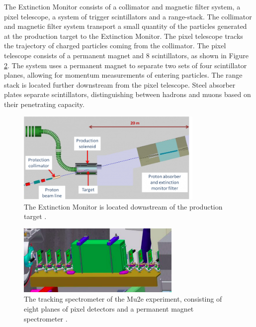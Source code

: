   The Extinction 
Monitor consists of a collimator and magnetic filter 
system, a pixel telescope, a system of trigger scintillators and a range-stack. The collimator and 
magnetic filter system transport a small quantity of 
the particles generated at the production target to the Extinction Monitor. The pixel telescope 
tracks the trajectory of charged particles coming from 
the collimator. The pixel telescope consists of a permanent magnet and 8 scintillators, as shown 
in Figure \ref{fig:extintionmonitor}. The system uses a 
permanent magnet to separate two sets of four scintillator planes, allowing for momentum measurements 
of entering particles. The range stack is located further 
downstream from the pixel telescope. Steel absorber plates separate scintillators, distinguishing 
between hadrons and muons based on their penetrating capacity.
\begin{figure}[!h]
\centering
\includegraphics[width =0.8\textwidth]{figures/png/800px-Extinction_filter.png}
\caption[The Extintion Monitor location.]{The Extinction Monitor is located downstream of the
production target \cite{Prebys:IPAC2015-THPF121}.}
\label{fig:extintion}
\end{figure}
\begin{figure}[!h]
\centering
\includegraphics[width =0.7\textwidth]{figures/png/Screenshot_20240306_184720.png}
\caption[The Extintion Monitor.]{The tracking spectrometer of the Mu2e experiment, consisting of eight planes of pixel detectors and a permanent magnet spectrometer \cite{Prebys:IPAC2015-THPF121}.}
\label{fig:extintionmonitor}
\end{figure}
